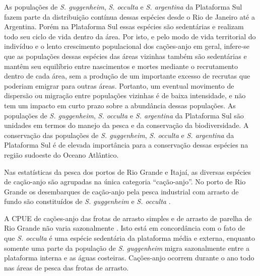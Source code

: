 \documentclass[a4paper,11pt,twoside,showtrims,onecolumn,openright,final]{memoir}
\begin{document}
As populações de \emph{S. guggenheim}, \emph{S. occulta} e \emph{S. argentina} da Plataforma Sul 
fazem parte da distribuição contínua dessas espécies desde o Rio de Janeiro até a Argentina. 
Porém na Plataforma Sul essas espécies são 
sedentárias e realizam todo seu ciclo de vida dentro da área. 
Por isto, e pelo modo de vida territorial do indivíduo e o lento crescimento populacional 
dos cações-anjo em geral, infere-se que as populações dessas espécies das áreas vizinhas 
também são sedentárias e mantêm seu equilíbrio entre nascimentos e mortes mediante o recrutamento 
dentro de cada área, sem a produção de um importante excesso de recrutas que poderiam emigrar para 
outras áreas. Portanto, um eventual movimento de dispersão ou migração entre populações vizinhas 
é de baixa intensidade, e não tem um impacto em curto prazo sobre a abundância dessas populações. 
As populações de \emph{S. guggenheim}, \emph{S. occulta} e \emph{S. argentina} da Plataforma Sul 
são unidades em termos do manejo da pesca e da conservação da biodiversidade. 
A conservação das populações de \emph{S. guggenheim}, \emph{S. occulta} e \emph{S. argentina} 
da Plataforma Sul é de elevada importância para a conservação dessas espécies na região sudoeste 
do Oceano Atlântico.  

Nas estatísticas da pesca dos portos de Rio Grande e Itajaí, as diversas espécies de cação-anjo são 
agrupadas na única categoria ``cação-anjo''.  No porto de Rio Grande os desembarques de cação-anjo 
pela pesca industrial com arrasto de fundo são constituídos de \emph{S. guggenheim} 
e \emph{S. occulta} \citep{vieira1996,miranda1999}. %

A CPUE de cações-anjo das frotas de arrasto simples e de arrasto de parelha de Rio Grande 
não varia sazonalmente \citep{miranda2003}. %
Isto está em concordância com o fato de que \emph{S. occulta} é uma espécie sedentária 
da plataforma média e externa, enquanto somente uma parte da população de \emph{S. guggenheim} 
migra sazonalmente entre a plataforma interna e as águas costeiras. Cações-anjo ocorrem 
durante o ano todo nas áreas de pesca das frotas de arrasto.
\end{document}

